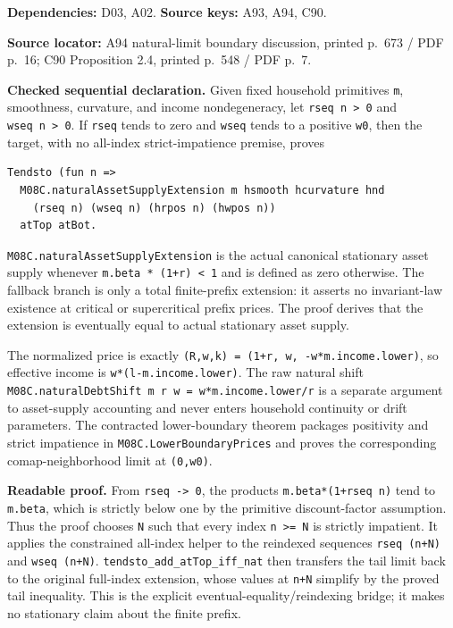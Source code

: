 \documentclass[
  11pt,
]{article}
\let\LedgerOriginalTexttt\texttt
\renewcommand{\texttt}[1]{{\small\LedgerOriginalTexttt{#1}}}
\begin{document}
\textbf{Dependencies:} D03, A02. \textbf{Source keys:} A93, A94, C90.

\textbf{Source locator:} A94 natural-limit boundary discussion, printed
p.~673 / PDF p.~16; C90 Proposition 2.4, printed p.~548 / PDF p.~7.

\textbf{Checked sequential declaration.} Given fixed household
primitives \texttt{m}, smoothness, curvature, and income nondegeneracy,
let \texttt{rseq\ n\ \textgreater{}\ 0} and
\texttt{wseq\ n\ \textgreater{}\ 0}. If \texttt{rseq} tends to zero and
\texttt{wseq} tends to a positive \texttt{w0}, then the target, with no
all-index strict-impatience premise, proves

\begin{verbatim}
Tendsto (fun n =>
  M08C.naturalAssetSupplyExtension m hsmooth hcurvature hnd
    (rseq n) (wseq n) (hrpos n) (hwpos n))
  atTop atBot.
\end{verbatim}

\texttt{M08C.naturalAssetSupplyExtension} is the actual canonical
stationary asset supply whenever
\texttt{m.beta\ *\ (1+r)\ \textless{}\ 1} and is defined as zero
otherwise. The fallback branch is only a total finite-prefix extension:
it asserts no invariant-law existence at critical or supercritical
prefix prices. The proof derives that the extension is eventually equal
to actual stationary asset supply.

The normalized price is exactly
\texttt{(R,w,k)\ =\ (1+r,\ w,\ -w*m.income.lower)}, so effective income
is \texttt{w*(l-m.income.lower)}. The raw natural shift
\texttt{M08C.naturalDebtShift\ m\ r\ w\ =\ w*m.income.lower/r} is a
separate argument to asset-supply accounting and never enters household
continuity or drift parameters. The contracted lower-boundary theorem
packages positivity and strict impatience in
\texttt{M08C.LowerBoundaryPrices} and proves the corresponding
comap-neighborhood limit at \texttt{(0,w0)}.

\textbf{Readable proof.} From \texttt{rseq\ -\textgreater{}\ 0}, the
products \texttt{m.beta*(1+rseq\ n)} tend to \texttt{m.beta}, which is
strictly below one by the primitive discount-factor assumption. Thus the
proof chooses \texttt{N} such that every index
\texttt{n\ \textgreater{}=\ N} is strictly impatient. It applies the
constrained all-index helper to the reindexed sequences
\texttt{rseq\ (n+N)} and \texttt{wseq\ (n+N)}.
\texttt{tendsto\_add\_atTop\_iff\_nat} then transfers the tail limit
back to the original full-index extension, whose values at \texttt{n+N}
simplify by the proved tail inequality. This is the explicit
eventual-equality/reindexing bridge; it makes no stationary claim about
the finite prefix.
\end{document}
